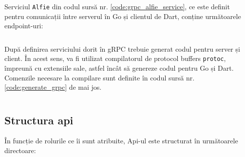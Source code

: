 Serviciul \texttt{Alfie} din codul sursă nr. \ref{code:grpc_alfie_service}, ce este definit pentru comunicații între serverul în Go și clientul de Dart, conține următoarele endpoint-uri:

\begin{code}
    \inputminted[frame=single,framesep=2mm,linenos,breaklines,tabsize=2]{protobuf}{code/alfie-service.proto}
    \label{code:grpc_alfie_service}
\end{code}

După definirea serviciului dorit în gRPC trebuie generat codul pentru server și client. În acest sens, va fi utilizat compilatorul de protocol buffers \texttt{protoc}, împreună cu extensiile sale, astfel încât să genereze codul pentru Go și Dart. Comenzile necesare la compilare sunt definite în codul sursă nr. \ref{code:generate_grpc} de mai jos.

\begin{code}
    \inputminted[frame=single,framesep=2mm,linenos,breaklines,tabsize=2]{bash}{code/generate-grpc.sh}
    \label{code:generate_grpc}
\end{code}

\subsection{Structura api}

În funcție de rolurile ce îi sunt atribuite, Api-ul este structurat în următoarele directoare:

